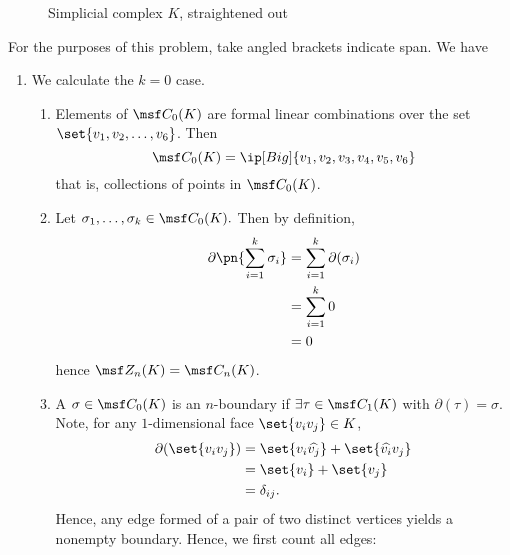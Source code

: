 \begin{solution}
\begin{figure}[H]
    \caption{Simplicial complex $K$, straightened out}
  \end{figure}
  For the purposes of this problem, take angled brackets indicate span. We have
  \begin{enumerate}[label=(\roman*)]
    \item We calculate the $k=0$ case.
      \begin{enumerate}
        \item Elements of $\msf C_0(K)$ are formal linear combinations over the
          set $\set{v_1, v_2, \ldots, v_6}$. Then
          \[
            \msf C_0(K) = \ip[Big]{v_1, v_2, v_3, v_4, v_5, v_6}
          \]
          that is, collections of points in $\msf C_0(K)$.
        \item Let $\sigma_1, \ldots, \sigma_k \in \msf C_0(K).$ Then by definition,
          \begin{align*}
            \partial\pn{\sum_{i=1}^k \sigma_i}
            &= \sum_{i=1}^k \partial(\sigma_i)\\
            &= \sum_{i=1}^k 0 \\
            &= 0
          \end{align*}
          hence $\msf Z_n(K) = \msf C_n(K)$.
        \item A $\sigma \in \msf C_0(K)$ is an $n$-boundary if $\exists \tau \in
          \msf C_{1}(K)$ with $\partial(\tau) = \sigma$. Note, for any
          $1$-dimensional face $\set{v_iv_j} \in K$,
          \begin{align*}
            \partial(\set{v_iv_j})
            &= \set{v_i \widehat{v_j}} + \set{\widehat{v_i}v_j} \\
            &= \set{v_i} + \set{v_j} \\
            &= \delta_{ij}.
          \end{align*}
          Hence, any edge formed of a pair of two distinct vertices yields a
          nonempty boundary. Hence, we first count all edges:
          \begin{figure}[H]
            \centering
            \begin{tikzpicture}[
              scale = .6,
              every node/.style={
                circle,
                draw=black,
                fill=white,
                inner sep=0pt,
                minimum size=7pt
              }
              ]


\end{tikzpicture}
\end{figure}
\end{enumerate}
\end{enumerate}
\end{solution}

